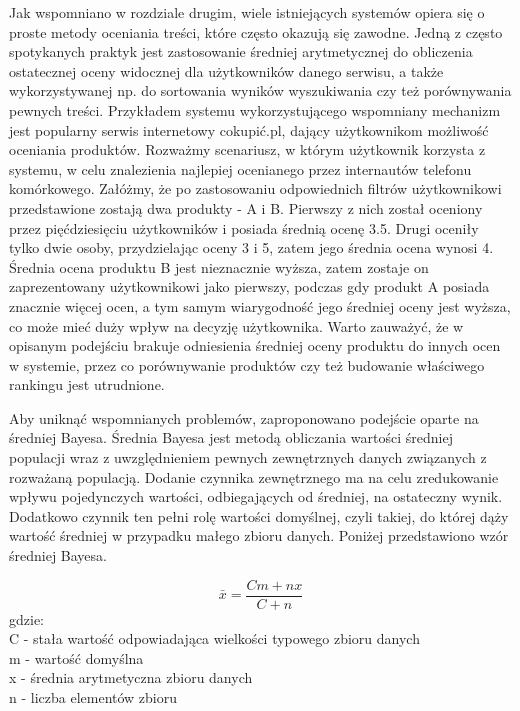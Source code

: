 Jak wspomniano w rozdziale drugim, wiele istniejących systemów opiera się o proste metody oceniania treści, które często okazują się zawodne. Jedną z często spotykanych praktyk jest zastosowanie średniej arytmetycznej do obliczenia ostatecznej oceny widocznej dla użytkowników danego serwisu, a także wykorzystywanej np. do sortowania wyników wyszukiwania czy też porównywania pewnych treści. Przykładem systemu wykorzystującego wspomniany mechanizm jest popularny serwis internetowy cokupić.pl, dający użytkownikom możliwość oceniania produktów. Rozważmy scenariusz, w którym użytkownik korzysta z systemu, w celu znalezienia najlepiej ocenianego przez internautów telefonu komórkowego. Załóżmy, że po zastosowaniu odpowiednich filtrów użytkownikowi przedstawione zostają dwa produkty - A i B. Pierwszy z nich został oceniony przez pięćdziesięciu użytkowników i posiada średnią ocenę 3.5. Drugi oceniły tylko dwie osoby, przydzielając oceny 3 i 5, zatem jego średnia ocena wynosi 4. Średnia ocena produktu B jest nieznacznie wyższa, zatem zostaje on zaprezentowany użytkownikowi jako pierwszy, podczas gdy produkt A posiada znacznie więcej ocen, a tym samym wiarygodność jego średniej oceny jest wyższa, co może mieć duży wpływ na decyzję użytkownika. Warto zauważyć, że w opisanym podejściu brakuje odniesienia średniej oceny produktu do innych ocen w systemie, przez co porównywanie produktów czy też budowanie właściwego rankingu jest utrudnione.

Aby uniknąć wspomnianych problemów, zaproponowano podejście oparte na średniej Bayesa. Średnia Bayesa jest metodą obliczania wartości średniej populacji wraz z uwzględnieniem pewnych zewnętrznych danych związanych z rozważaną populacją. Dodanie czynnika zewnętrznego ma na celu zredukowanie wpływu pojedynczych wartości, odbiegających od średniej, na ostateczny wynik. Dodatkowo czynnik ten pełni rolę wartości domyślnej, czyli takiej, do której dąży wartość średniej w przypadku małego zbioru danych.\cite{bayesWiki} Poniżej przedstawiono wzór średniej Bayesa.

\begin{equation}
\bar{x}=\frac{Cm+nx}{C+n}
\end{equation}
gdzie:\\
C - stała wartość odpowiadająca wielkości typowego zbioru danych\\
m - wartość domyślna\\
x - średnia arytmetyczna zbioru danych\\
n - liczba elementów zbioru\\


